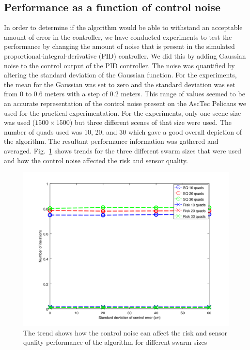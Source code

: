 \documentclass{article}
\begin{document}
\subsection{Performance as a function of control noise}

In order to determine if the algorithm would be able to withstand an acceptable
amount of error in the controller, we have conducted experiments to test the
performance by changing the amount of noise that is present in the simulated
proportional-integral-derivative (PID) controller. We did this by adding
Gaussian noise to the control output of the PID controller. The noise was
quantified by altering the standard deviation of the Gaussian function. For the
experiments, the mean for the Gaussian was set to zero and the standard
deviation was set from 0 to 0.6 meters with a step of 0.2 meters. This range of
values seemed to be an accurate representation of the control noise present on
the AscTec Pelicans we used for the practical experimentation. For the
experiments, only one scene size was used ($1500 \times 1500$) but three
different scenes of that size were used. The number of quads used was 10, 20,
and 30 which gave a good overall depiction of the algorithm. The resultant
performance information was gathered and averaged. Fig.~\ref{fig:res_cn_r_sq}
shows trends for the three different swarm sizes that were used and how the
control noise affected the risk and sensor quality.

\begin{figure}[h!]

    \includegraphics[width=1\columnwidth]{tasefigs/cn_sq_risk.png}

    \caption{The trend shows how the control noise can affect the risk and
        sensor quality performance of the algorithm for different swarm sizes}

    \label{fig:res_cn_r_sq}

\end{figure}
\end{document}
